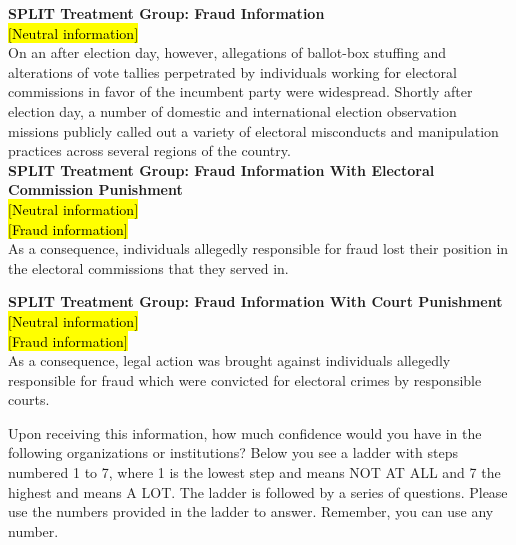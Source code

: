 \documentclass[11pt, ngerman,english,a4]{article}
\begin{document}

\noindent \textbf{SPLIT Treatment Group: Fraud Information} \\
\hl{$[$Neutral information$]$} \\
On an after election day, however, allegations of ballot-box stuffing and alterations of vote tallies perpetrated by individuals working for electoral commissions in favor of the incumbent party were widespread. Shortly after election day, a number of domestic and international election observation missions publicly called out a variety of electoral misconducts and manipulation practices across several regions of the country. \\

\noindent \textbf{SPLIT Treatment Group: Fraud Information With Electoral Commission Punishment} \\
\hl{$[$Neutral information$]$} \\
\hl{$[$Fraud information$]$} \\
As a consequence, individuals allegedly responsible for fraud lost their position in the electoral commissions that they served in. \\

\newpage

\noindent \textbf{SPLIT Treatment Group: Fraud Information With Court Punishment} \\
\hl{$[$Neutral information$]$} \\
\hl{$[$Fraud information$]$} \\
As a consequence, legal action was brought against individuals allegedly responsible for fraud which were convicted for electoral crimes by responsible courts. \\

\vspace{1cm}

\noindent Upon receiving this information, how much confidence would you have in the following organizations or institutions? Below you see a ladder with steps numbered 1 to 7, where 1 is the lowest step and means NOT AT ALL and 7 the highest and means A LOT. The ladder is followed by a series of questions. Please use the numbers provided in the ladder to answer. Remember, you can use any number. \\
\end{document}
